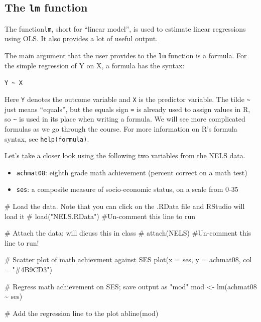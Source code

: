 \documentclass[
  letterpaper,
  DIV=11,
  numbers=noendperiod]{scrreprt}
\newenvironment{Shaded}{\begin{snugshade}}{\end{snugshade}}
\newcommand{\AttributeTok}[1]{\textcolor[rgb]{0.40,0.45,0.13}{#1}}
\newcommand{\CommentTok}[1]{\textcolor[rgb]{0.37,0.37,0.37}{#1}}
\newcommand{\FunctionTok}[1]{\textcolor[rgb]{0.28,0.35,0.67}{#1}}
\newcommand{\NormalTok}[1]{\textcolor[rgb]{0.00,0.23,0.31}{#1}}
\newcommand{\OtherTok}[1]{\textcolor[rgb]{0.00,0.23,0.31}{#1}}
\newcommand{\SpecialCharTok}[1]{\textcolor[rgb]{0.37,0.37,0.37}{#1}}
\newcommand{\StringTok}[1]{\textcolor[rgb]{0.13,0.47,0.30}{#1}}
\begin{document}
\hypertarget{the-lm-function}{%
\subsection{\texorpdfstring{The \texttt{lm}
function}{The lm function}}\label{the-lm-function}}

The function\texttt{lm}, short for ``linear model'', is used to estimate
linear regressions using OLS. It also provides a lot of useful output.

The main argument that the user provides to the \texttt{lm} function is
a formula. For the simple regression of Y on X, a formula has the
syntax:

\texttt{Y\ \textasciitilde{}\ X}

Here \texttt{Y} denotes the outcome variable and \texttt{X} is the
predictor variable. The tilde \texttt{\textasciitilde{}} just means
``equals'', but the equals sign \texttt{=} is already used to assign
values in R, so \texttt{\textasciitilde{}} is used in its place when
writing a formula. We will see more complicated formulas as we go
through the course. For more information on R's formula syntax, see
\texttt{help(formula)}.

Let's take a closer look using the following two variables from the NELS
data.

\begin{itemize}
\item
  \texttt{achmat08}: eighth grade math achievement (percent correct on a
  math test)
\item
  \texttt{ses}: a composite measure of socio-economic status, on a scale
  from 0-35
\end{itemize}

\begin{Shaded}
\begin{Highlighting}[]
\CommentTok{\# Load the data. Note that you can click on the .RData file and RStudio will load it}
\CommentTok{\# load("NELS.RData") \#Un{-}comment this line to run}

\CommentTok{\# Attach the data: will dicuss this in class}
\CommentTok{\# attach(NELS) \#Un{-}comment this line to run!}

\CommentTok{\# Scatter plot of math achievment against SES}
\FunctionTok{plot}\NormalTok{(}\AttributeTok{x =}\NormalTok{ ses, }\AttributeTok{y =}\NormalTok{ achmat08, }\AttributeTok{col =} \StringTok{"\#4B9CD3"}\NormalTok{)}

\CommentTok{\# Regress math achievement on SES; save output as "mod"}
\NormalTok{mod }\OtherTok{\textless{}{-}} \FunctionTok{lm}\NormalTok{(achmat08 }\SpecialCharTok{\textasciitilde{}}\NormalTok{ ses)}

\CommentTok{\# Add the regression line to the plot}
\FunctionTok{abline}\NormalTok{(mod)}
\end{Highlighting}
\end{Shaded}
\end{document}
